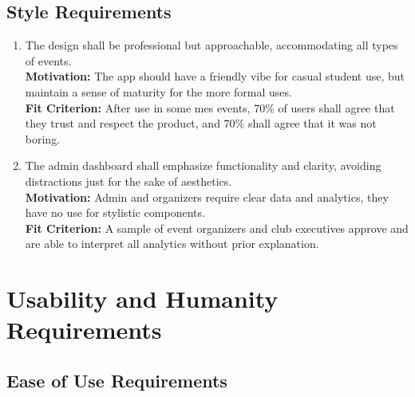 \documentclass[12pt]{article}
\begin{document}
\subsection{Style Requirements}
\begin{enumerate}[label=LFR-S.\arabic*, wide=0pt, leftmargin=*]
  \item \label{LFSR1} The design shall be professional but approachable, accommodating all types of events.\\[2mm]
    {\bf Motivation:} The app should have a friendly vibe for casual student use, but maintain a sense of maturity for the more formal uses.\\
    {\bf Fit Criterion:} After use in some \gls{mes} events, 70\% of users shall agree that they trust and respect the product, and 70\% shall agree that it was not boring.
  \item \label{LFSR2} The admin dashboard shall emphasize functionality and clarity, avoiding distractions just for the sake of aesthetics.\\[2mm]
    {\bf Motivation:} Admin and organizers require clear data and analytics, they have no use for stylistic components.\\
    {\bf Fit Criterion:} A sample of event organizers and club executives approve and are able to interpret all analytics without prior explanation.
\end{enumerate}

\section{Usability and Humanity Requirements}
\subsection{Ease of Use Requirements}
\end{document}
